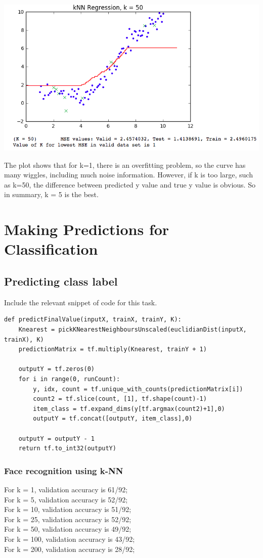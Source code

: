 \documentclass{article}
\begin{document}
\begin{center}
\includegraphics[scale=0.6]{4.png}
\end{center}


The plot shows that for k=1, there is an overfitting problem, so the curve has many wiggles, including much noise information. However, if k is too large, such as k=50, the difference between predicted y value and true y value is obvious. So in summary, k = 5 is the best.


\section{Making Predictions for Classification}
\subsection{Predicting class label}
Include the relevant snippet of code for this task.

\begin{verbatim}
def predictFinalValue(inputX, trainX, trainY, K):
    Knearest = pickKNearestNeighboursUnscaled(euclidianDist(inputX, trainX), K)
    predictionMatrix = tf.multiply(Knearest, trainY + 1)

    outputY = tf.zeros(0)    
    for i in range(0, runCount):
        y, idx, count = tf.unique_with_counts(predictionMatrix[i])
        count2 = tf.slice(count, [1], tf.shape(count)-1)
        item_class = tf.expand_dims(y[tf.argmax(count2)+1],0)
        outputY = tf.concat([outputY, item_class],0)
    
    outputY = outputY - 1
    return tf.to_int32(outputY)
\end{verbatim}

\subsubsection{Face recognition using k-NN}
For k = 1, validation accuracy is 61/92;\\
For k = 5, validation accuracy is 52/92;\\
For k = 10, validation accuracy is 51/92;\\
For k = 25, validation accuracy is 52/92;\\
For k = 50, validation accuracy is 49/92;\\
For k = 100, validation accuracy is 43/92;\\
For k = 200, validation accuracy is 28/92;\\
\end{document}
